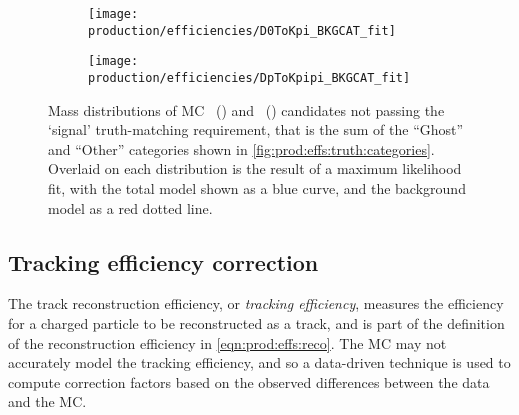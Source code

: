 \begin{figure}
  \begin{subfigure}[b]{0.5\textwidth}
    \centering
    \texttt{[image: production/efficiencies/D0ToKpi\_BKGCAT\_fit]}
    \caption{\DzToKpi}
    \label{fig:prod:effs:truth:fit:D0ToKpi}
  \end{subfigure}
  \begin{subfigure}[b]{0.5\textwidth}
    \centering
    \texttt{[image: production/efficiencies/DpToKpipi\_BKGCAT\_fit]}
    \caption{\DpToKpipi}
    \label{fig:prod:effs:truth:fit:DpToKpipi}
  \end{subfigure}
  \caption{%
    Mass distributions of \ac{MC} 
    \PDzero~() and 
    \PDplus~() candidates not 
    passing the `signal' truth-matching requirement, that is the sum of the 
    ``Ghost'' and ``Other'' categories shown in 
    \cref{fig:prod:effs:truth:categories}.
    Overlaid on each distribution is the result of a maximum likelihood fit, 
    with the total model shown as a blue curve, and the background model as a 
    red dotted line.
  }
  \label{fig:prod:effs:truth:fit}
\end{figure}

\subsection{Tracking efficiency correction}
\label{chap:prod:effs:tracking}

The track reconstruction efficiency, or \emph{tracking efficiency}, measures 
the efficiency for a charged particle to be reconstructed as a track, and is 
part of the definition of the reconstruction efficiency in 
\cref{eqn:prod:effs:reco}.
The \ac{MC} may not accurately model the tracking efficiency, and so a 
data-driven technique is used to compute correction factors based on the 
observed differences between the data and the \ac{MC}.


